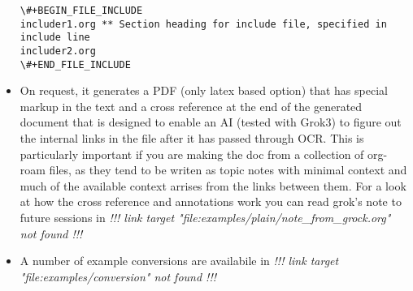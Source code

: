 \documentclass[11pt]{article}
\begin{document}
\begin{itemize}
\begin{verbatim}
\#+BEGIN_FILE_INCLUDE 
includer1.org ** Section heading for include file, specified in include line
includer2.org
\#+END_FILE_INCLUDE
\end{verbatim}
\vspace{\baselineskip}
\item
On request, it generates a PDF (only latex based option) that has special markup in the text and a cross reference at the end
  of the generated document that is designed to enable an AI (tested with Grok3) to figure out the
  internal links in the file after it has passed through OCR. This is particularly important if you
  are making the doc from a collection of org-roam files, as they tend to be writen as topic notes
  with minimal context and much of the available context arrises from the links between them. 
  For a look at how the cross reference and annotations work you can read grok's note to future
sessions in
\textit{!!! link target "file:examples/plain/note\_from\_grock.org" not found !!!}

\item
A number of example conversions are availabile in
\textit{!!! link target "file:examples/conversion" not found !!!}
\vspace{\baselineskip}
\end{itemize}
\end{document}
